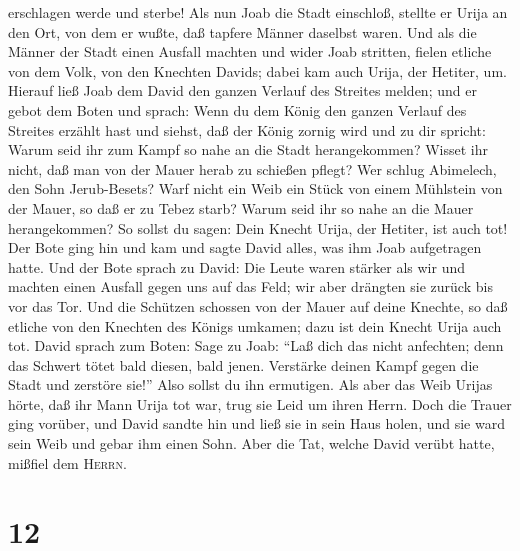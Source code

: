 erschlagen werde und sterbe!  Als nun Joab die Stadt
einschloß, stellte er Urija an den Ort, von dem er wußte, daß tapfere
Männer daselbst waren.  Und als die Männer der Stadt
einen Ausfall machten und wider Joab stritten, fielen etliche von dem
Volk, von den Knechten Davids; dabei kam auch Urija, der Hetiter, um.
 Hierauf ließ Joab dem David den ganzen Verlauf des
Streites melden;  und er gebot dem Boten und sprach: Wenn
du dem König den ganzen Verlauf des Streites erzählt hast
 und siehst, daß der König zornig wird und zu dir
spricht: Warum seid ihr zum Kampf so nahe an die Stadt herangekommen?
Wisset ihr nicht, daß man von der Mauer herab zu schießen pflegt?
 Wer schlug Abimelech, den Sohn Jerub-Besets? Warf nicht
ein Weib ein Stück von einem Mühlstein von der Mauer, so daß er zu Tebez
starb? Warum seid ihr so nahe an die Mauer herangekommen? So sollst du
sagen: Dein Knecht Urija, der Hetiter, ist auch tot!  Der
Bote ging hin und kam und sagte David alles, was ihm Joab aufgetragen
hatte.  Und der Bote sprach zu David: Die Leute waren
stärker als wir und machten einen Ausfall gegen uns auf das Feld; wir
aber drängten sie zurück bis vor das Tor.  Und die
Schützen schossen von der Mauer auf deine Knechte, so daß etliche von
den Knechten des Königs umkamen; dazu ist dein Knecht Urija auch tot.
 David sprach zum Boten: Sage zu Joab: ``Laß dich das
nicht anfechten; denn das Schwert tötet bald diesen, bald jenen.
Verstärke deinen Kampf gegen die Stadt und zerstöre sie!'' Also sollst
du ihn ermutigen.  Als aber das Weib Urijas hörte, daß
ihr Mann Urija tot war, trug sie Leid um ihren Herrn. 
Doch die Trauer ging vorüber, und David sandte hin und ließ sie in sein
Haus holen, und sie ward sein Weib und gebar ihm einen Sohn. Aber die
Tat, welche David verübt hatte, mißfiel dem \textsc{Herrn}.

\hypertarget{section-11}{%
\section{12}\label{section-11}}

